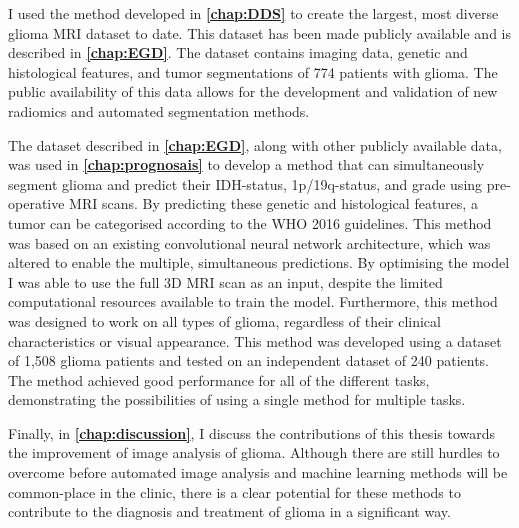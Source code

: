 I used the method developed in \textbf{\cref{chap:DDS}} to create the largest, most diverse glioma \gls{MRI} dataset to date.
This dataset has been made publicly available and is described in \textbf{\cref{chap:EGD}}.
The dataset contains imaging data, genetic and histological features, and \gls{tumor} segmentations of 774 patients with glioma.
The public availability of this data allows for the development and validation of new radiomics and automated segmentation methods.

The dataset described in \textbf{\cref{chap:EGD}}, along with other publicly available data, was used in \textbf{\cref{chap:prognosais}} to develop a method that can simultaneously segment glioma and predict their \gls{IDH}-status, 1p/19q-status, and grade using pre-operative \gls{MRI} scans.
By predicting these genetic and histological features, a \gls{tumor} can be categorised according to the \gls{WHO} 2016 guidelines.
This method was based on an existing convolutional neural network architecture, which was altered to enable the multiple, simultaneous predictions.
By optimising the model I was able to use the full 3D \gls{MRI} scan as an input, despite the limited computational resources available to train the model.
Furthermore, this method was designed to work on all types of glioma, regardless of their clinical characteristics or visual appearance.
This method was developed using a dataset of 1,508 glioma patients and tested on an independent dataset of 240 patients.
The method achieved good performance for all of the different tasks, demonstrating the possibilities of using a single method for multiple tasks.

Finally, in \textbf{\cref{chap:discussion}}, I discuss the contributions of this thesis towards the improvement of image analysis of glioma.
Although there are still hurdles to overcome before automated image analysis and machine learning methods will be common-place in the clinic, there is a clear potential for these methods to contribute to the diagnosis and treatment of glioma in a significant way.
